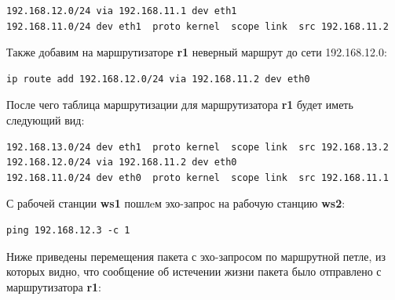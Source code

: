 \documentclass[a4paper,12pt]{article}
\begin{document}
\begin{Verbatim}
192.168.12.0/24 via 192.168.11.1 dev eth1 
192.168.11.0/24 dev eth1  proto kernel  scope link  src 192.168.11.2
\end{Verbatim}

Также добавим на маршрутизаторе \textbf{r1} неверный маршрут до сети 192.168.12.0:

\begin{Verbatim}
ip route add 192.168.12.0/24 via 192.168.11.2 dev eth0
\end{Verbatim}

После чего таблица маршрутизации для маршрутизатора \textbf{r1} будет иметь следующий вид:

\begin{Verbatim}
192.168.13.0/24 dev eth1  proto kernel  scope link  src 192.168.13.2 
192.168.12.0/24 via 192.168.11.2 dev eth0 
192.168.11.0/24 dev eth0  proto kernel  scope link  src 192.168.11.1
\end{Verbatim}

С рабочей станции \textbf{ws1} пошлeм эхо-запрос на рабочую станцию \textbf{ws2}:

\begin{Verbatim}
ping 192.168.12.3 -c 1
\end{Verbatim}

Ниже приведены перемещения пакета с эхо-запросом по маршрутной петле, из которых
видно, что сообщение об истечении жизни пакета было отправлено с маршрутизатора
\textbf{r1}:
\end{document}
